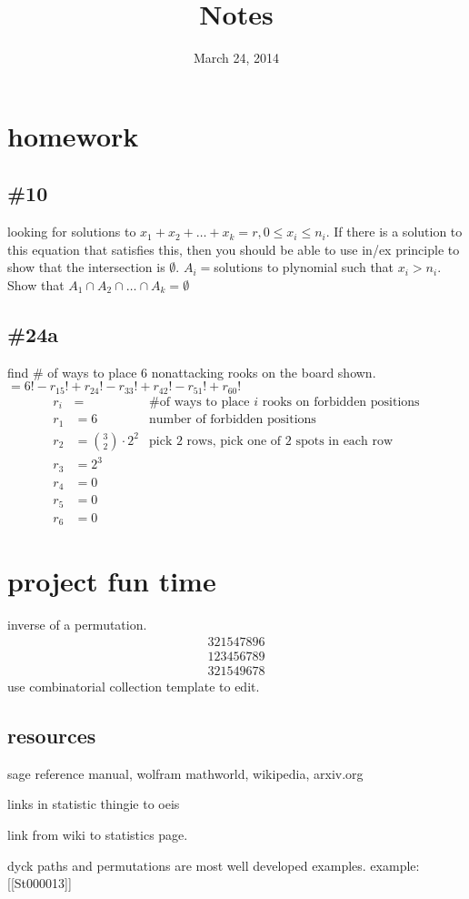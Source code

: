 \documentclass{article}
\begin{document}
\title{Notes}
\date{March 24, 2014}
\maketitle
\section*{homework}
\subsection*{\#10}
looking for solutions to $x_1+x_2+\dots+x_k=r, 0\le x_i\le n_i$. If there is a solution to this equation that satisfies this, then you should be able to use in/ex principle to show that the intersection is $\emptyset$. $A_i=$solutions to plynomial such that $x_i>n_i$. Show that $A_1\cap A_2\cap\dots\cap A_k=\emptyset$ 
\subsection*{\#24a}
find \# of ways to place 6 nonattacking rooks on the board shown. 
$=6!-r_15!+r_24!-r_33!+r_42!-r_51!+r_60!$
\begin{align*}
  r_i&=&\text{\# of ways to place $i$ rooks on forbidden positions}\\
  r_1&=6&\text{number of forbidden positions}\\
  r_2&=\binom{3}{2}\cdot2^2&\text{pick 2 rows, pick one of 2 spots in each row}\\
  r_3&=2^3\\
  r_4&=0\\
  r_5&=0\\
  r_6&=0
\end{align*}
\section*{project fun time}
inverse of a permutation. 
\begin{align*}
  321547896\\
  123456789\\
  321549678
\end{align*}
use combinatorial collection template to edit.

\subsection*{resources}
sage reference manual, wolfram mathworld, wikipedia, arxiv.org

links in statistic thingie to oeis

link from wiki to statistics page.

dyck paths and permutations are most well developed examples. example: [[St000013]]
\end{document}
